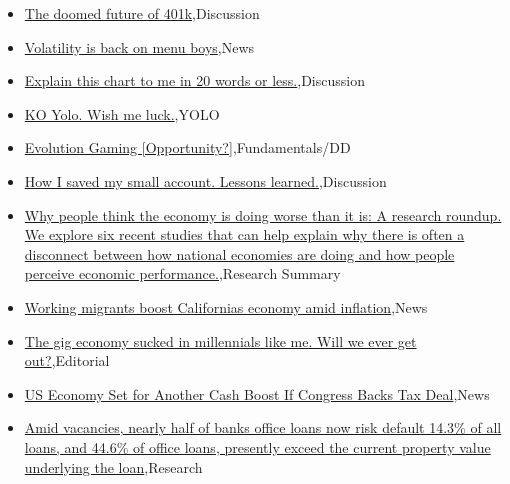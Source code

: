 \documentclass{article}%
\begin{document}
%
\begin{itemize}%
\item%
\href{https://reddit.com/r/wallstreetbets/comments/19719v2/the\_doomed\_future\_of\_401k/}{The doomed future of 401k},Discussion%
\item%
\href{https://reddit.com/r/wallstreetbets/comments/196zb6l/volatility\_is\_back\_on\_menu\_boys/}{Volatility is back on menu boys},News%
\item%
\href{https://reddit.com/r/wallstreetbets/comments/196ymv3/explain\_this\_chart\_to\_me\_in\_20\_words\_or\_less/}{Explain this chart to me in 20 words or less.},Discussion%
\item%
\href{https://reddit.com/r/wallstreetbets/comments/196xtzd/ko\_yolo\_wish\_me\_luck/}{KO Yolo. Wish me luck.},YOLO%
\item%
\href{https://reddit.com/r/StockMarket/comments/196qz4z/evolution\_gaming\_opportunity/}{Evolution Gaming [Opportunity?]},Fundamentals/DD%
\item%
\href{https://reddit.com/r/StockMarket/comments/196ed8d/how\_i\_saved\_my\_small\_account\_lessons\_learned/}{How I saved my small account. Lessons learned.},Discussion%
\item%
\href{https://reddit.com/r/Economics/comments/196witf/why\_people\_think\_the\_economy\_is\_doing\_worse\_than/}{Why people think the economy is doing worse than it is: A research roundup. We explore six recent studies that can help explain why there is often a disconnect between how national economies are doing and how people perceive economic performance.},Research Summary%
\item%
\href{https://reddit.com/r/Economics/comments/196wftq/working\_migrants\_boost\_californias\_economy\_amid/}{Working migrants boost Californias economy amid inflation},News%
\item%
\href{https://reddit.com/r/Economics/comments/196w9ew/the\_gig\_economy\_sucked\_in\_millennials\_like\_me/}{The gig economy sucked in millennials like me. Will we ever get out?},Editorial%
\item%
\href{https://reddit.com/r/Economics/comments/196u4x1/us\_economy\_set\_for\_another\_cash\_boost\_if\_congress/}{US Economy Set for Another Cash Boost If Congress Backs Tax Deal},News%
\item%
\href{https://reddit.com/r/Economics/comments/196qhp9/amid\_vacancies\_nearly\_half\_of\_banks\_office\_loans/}{Amid vacancies, nearly half of banks office loans now risk default  14.3\% of all loans, and 44.6\% of office loans, presently exceed the current property value underlying the loan},Research%
\end{itemize}%
\end{document}

